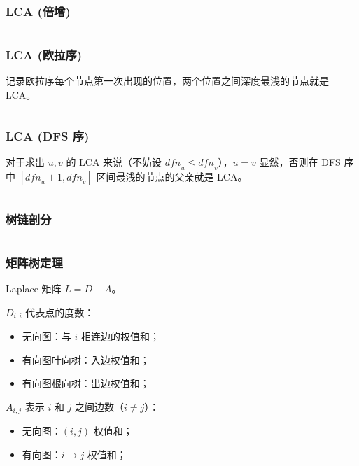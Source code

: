 \documentclass{article}
\begin{document}
\subsubsection{LCA (倍增)} %
\inputminted[breaklines, frame=single]{c++}{../algo/图论/树/LCA【倍增】.cpp}


\subsubsection{LCA (欧拉序)} %
记录欧拉序每个节点第一次出现的位置，两个位置之间深度最浅的节点就是 LCA。
\inputminted[breaklines, frame=single]{c++}{../algo/图论/树/LCA【欧拉序】.cpp}


\subsubsection{LCA (DFS 序)} %
对于求出 $u,v$ 的 LCA 来说（不妨设 $\textit{dfn}_u\le \textit{dfn}_v$），$u=v$ 显然，否则在 DFS 序中 $[\textit{dfn}_u+1,\textit{dfn}_v]$ 区间最浅的节点的父亲就是 LCA。
\inputminted[breaklines, frame=single]{c++}{../algo/图论/树/LCA【dfs序】.cpp}



\subsubsection{树链剖分} %
\inputminted[breaklines, frame=single]{c++}{../algo/图论/树/树链剖分【非封装版】.cpp}


\subsubsection{矩阵树定理} %

Laplace 矩阵 $L=D-A$。



\begin{minipage}[t]{0.45\textwidth}
    $D_{i,i}$ 代表点的度数：
    \begin{itemize}[noitemsep, topsep=-5pt]
        \item 无向图：与 $i$ 相连边的权值和；
        \item 有向图叶向树：入边权值和；
        \item 有向图根向树：出边权值和；
    \end{itemize}
\end{minipage}
\hfill
\begin{minipage}[t]{0.45\textwidth}
    $A_{i,j}$ 表示 $i$ 和 $j$ 之间边数（$i\ne j$）：
    \begin{itemize}[noitemsep, topsep=-5pt]
        \item 无向图：$(i,j)$ 权值和；
        \item 有向图：$i\to j$ 权值和；
    \end{itemize}
\end{minipage}
\bigskip
\end{document}
